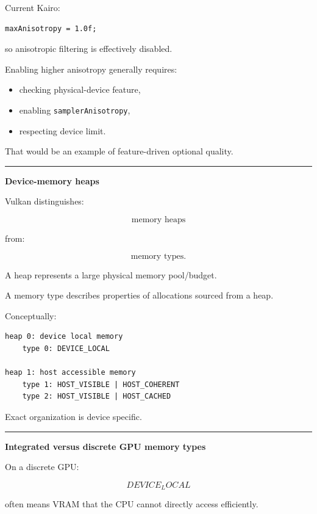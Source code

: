 Current Kairo:

\begin{verbatim}
maxAnisotropy = 1.0f;
\end{verbatim}

so anisotropic filtering is effectively disabled.

Enabling higher anisotropy generally requires:

\begin{itemize}
\tightlist
\item
  checking physical-device feature,
\item
  enabling \texttt{samplerAnisotropy},
\item
  respecting device limit.
\end{itemize}

That would be an example of feature-driven optional quality.

\begin{center}\rule{0.5\linewidth}{0.5pt}\end{center}

\textbf{Device-memory heaps}

Vulkan distinguishes:

\[
\boxed{
\text{memory heaps}
}
\]

from:

\[
\boxed{
\text{memory types}.
}
\]

A heap represents a large physical memory pool/budget.

A memory type describes properties of allocations sourced from a heap.

Conceptually:

\begin{verbatim}
heap 0: device local memory
    type 0: DEVICE_LOCAL

heap 1: host accessible memory
    type 1: HOST_VISIBLE | HOST_COHERENT
    type 2: HOST_VISIBLE | HOST_CACHED
\end{verbatim}

Exact organization is device specific.

\begin{center}\rule{0.5\linewidth}{0.5pt}\end{center}

\textbf{Integrated versus discrete GPU memory types}

On a discrete GPU:

\[
DEVICE_LOCAL
\]

often means VRAM that the CPU cannot directly access efficiently.

